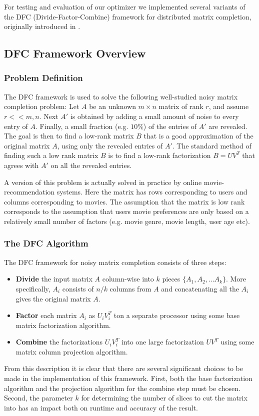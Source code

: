 For testing and evaluation of our optimizer we implemented several variants of the DFC (Divide-Factor-Combine) framework for distributed matrix completion, originally introduced in \cite{Ameet}.

\subsection{DFC Framework Overview}
\subsubsection{Problem Definition}
The DFC framework is used to solve the following well-studied noisy matrix completion problem: Let $A$ be an unknown $m\times n$ matrix of rank $r$, and assume $r<<m,n$. Next $A'$ is obtained by adding a small amount of noise to every entry of $A$. Finally, a small fraction (e.g. $10\%$) of the entries of $A'$ are revealed. The goal is then to find a low-rank matrix $B$ that is a good approximation of the original matrix $A$, using only the revealed entries of $A'$. The standard method of finding such a low rank matrix $B$ is to find a low-rank factorization $B=UV^T$ that agrees with $A'$ on all the revealed entries.

A version of this problem is actually solved in practice by online movie-recommendation systems. Here the matrix has rows corresponding to users and columns corresponding to movies. The assumption that the matrix is low rank corresponds to the assumption that users movie preferences are only based on a relatively small number of factors (e.g. movie genre, movie length, user age etc).

\subsubsection{The DFC Algorithm}
The DFC framework for noisy matrix completion consists of three steps:
\begin{itemize}
\item \textbf{Divide} the input matrix $A$ column-wise into $k$ pieces $\{A_1,A_2,...A_k\}$. More specifically, $A_i$ consists of $n/k$ columns from $A$ and concatenating all the $A_i$ gives the original matrix $A$.
\item \textbf{Factor} each matrix $A_i$ as $U_i V_i^T$ ton a separate processor using some base matrix factorization algorithm.
\item \textbf{Combine} the factorizations $U_iV_i^T$ into one large factorization $UV^T$ using some matrix column projection algorithm.
\end{itemize}
From this description it is clear that there are several significant choices to be made in the implementation of this framework. First, both the base factorization algorithm and the projection algorithm for the combine step must be chosen. Second, the parameter $k$ for determining the number of slices to cut the matrix into has an impact both on runtime and accuracy of the result.

